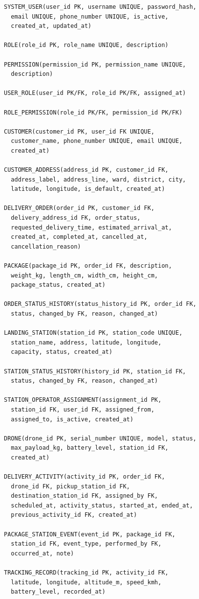 \begin{verbatim}
SYSTEM_USER(user_id PK, username UNIQUE, password_hash,
  email UNIQUE, phone_number UNIQUE, is_active,
  created_at, updated_at)

ROLE(role_id PK, role_name UNIQUE, description)

PERMISSION(permission_id PK, permission_name UNIQUE,
  description)

USER_ROLE(user_id PK/FK, role_id PK/FK, assigned_at)

ROLE_PERMISSION(role_id PK/FK, permission_id PK/FK)

CUSTOMER(customer_id PK, user_id FK UNIQUE,
  customer_name, phone_number UNIQUE, email UNIQUE,
  created_at)

CUSTOMER_ADDRESS(address_id PK, customer_id FK,
  address_label, address_line, ward, district, city,
  latitude, longitude, is_default, created_at)

DELIVERY_ORDER(order_id PK, customer_id FK,
  delivery_address_id FK, order_status,
  requested_delivery_time, estimated_arrival_at,
  created_at, completed_at, cancelled_at,
  cancellation_reason)

PACKAGE(package_id PK, order_id FK, description,
  weight_kg, length_cm, width_cm, height_cm,
  package_status, created_at)

ORDER_STATUS_HISTORY(status_history_id PK, order_id FK,
  status, changed_by FK, reason, changed_at)

LANDING_STATION(station_id PK, station_code UNIQUE,
  station_name, address, latitude, longitude,
  capacity, status, created_at)

STATION_STATUS_HISTORY(history_id PK, station_id FK,
  status, changed_by FK, reason, changed_at)

STATION_OPERATOR_ASSIGNMENT(assignment_id PK,
  station_id FK, user_id FK, assigned_from,
  assigned_to, is_active, created_at)

DRONE(drone_id PK, serial_number UNIQUE, model, status,
  max_payload_kg, battery_level, station_id FK,
  created_at)

DELIVERY_ACTIVITY(activity_id PK, order_id FK,
  drone_id FK, pickup_station_id FK,
  destination_station_id FK, assigned_by FK,
  scheduled_at, activity_status, started_at, ended_at,
  previous_activity_id FK, created_at)

PACKAGE_STATION_EVENT(event_id PK, package_id FK,
  station_id FK, event_type, performed_by FK,
  occurred_at, note)

TRACKING_RECORD(tracking_id PK, activity_id FK,
  latitude, longitude, altitude_m, speed_kmh,
  battery_level, recorded_at)


\end{verbatim}
